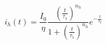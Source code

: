 \begin{equation}
i_h \left( t \right) = \frac{I_0}{\eta} \frac{{\left (\frac{t}{\tau_1} \right )}^{n_h}}{1 + {\left (\frac{t}{\tau_1} \right )}^{n_h}} e^{-\frac{t}{\tau_2}}
\label{eqn:HF}
\end{equation}
